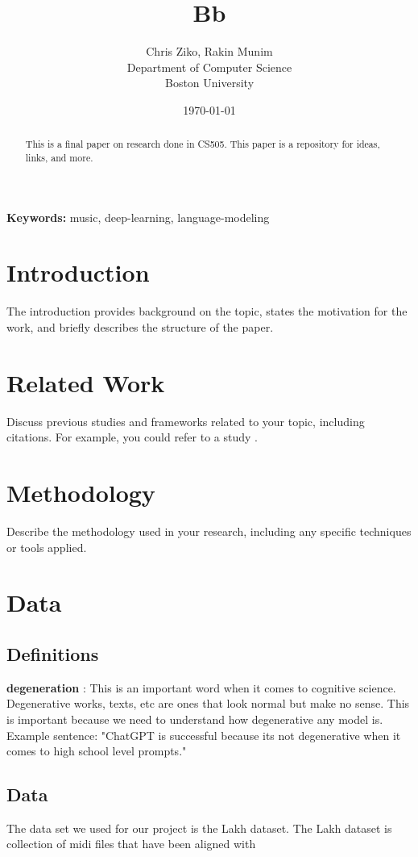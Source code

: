 \documentclass[12pt]{article}
\title{Bb}
\author{Chris Ziko, Rakin Munim \\ Department of Computer Science \\ Boston University}
\date{\today}
\begin{document}
\maketitle

\begin{abstract}
This is a final paper on research done in CS505. This paper is a repository for ideas, links, and more. 
\end{abstract}

\textbf{Keywords:} music, deep-learning, language-modeling

\section{Introduction}
The introduction provides background on the topic, states the motivation for the work, and briefly describes the structure of the paper.

\section{Related Work}
Discuss previous studies and frameworks related to your topic, including citations. For example, you could refer to a study \cite{raffel2016lakhmidi}.

\section{Methodology}
Describe the methodology used in your research, including any specific techniques or tools applied.

\section{Data}

\subsection{Definitions}
\textbf{degeneration} : This is an important word when it comes to cognitive science. Degenerative works, texts, etc are ones that look normal but make no sense. This is important because we need to understand how degenerative any model is. Example sentence: "ChatGPT is successful because its not degenerative when it comes to high school level prompts." 



\subsection{Data}
The data set we used for our project is the Lakh dataset. The Lakh dataset is collection of midi files that have been aligned with 
\end{document}
